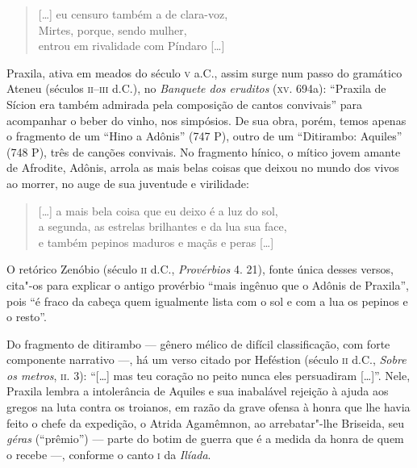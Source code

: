 \begin{quote}
\mbox[\ldots{}] eu censuro também a de clara-voz,\\
Mirtes, porque, sendo mulher,\\
entrou em rivalidade com Píndaro [\ldots{}]
\end{quote}

Praxila, ativa em meados do século \textsc{v} a.C., assim surge num passo do gramático
Ateneu (séculos \textsc{ii}--\textsc{iii} d.C.), no \textit{Banquete dos eruditos} (\textsc{xv}. 694a):
``Praxila de Sícion era também admirada pela composição de cantos
convivais” para acompanhar o beber do vinho, nos simpósios. De sua obra,
porém, temos apenas o fragmento de um “Hino a Adônis” (747 P), outro
de um “Ditirambo: Aquiles” (748 P), três de canções convivais. No fragmento
hínico, o mítico jovem amante de Afrodite, Adônis, arrola as mais belas coisas
que deixou no mundo dos vivos ao morrer, no auge de sua juventude e virilidade:

\begin{quote}
\mbox[\ldots{}] a mais bela coisa que eu deixo é a luz do sol,\\
a segunda, as estrelas brilhantes e da lua sua face,\\
e também pepinos maduros e maçãs e peras [\ldots{}]
\end{quote}

O retórico Zenóbio (século \textsc{ii} d.C., \textit{Provérbios} 4. 21), fonte única
desses versos, cita"-os para explicar o antigo provérbio ``mais ingênuo
que o Adônis de Praxila”, pois “é fraco da cabeça quem igualmente
lista com o sol e com a lua os pepinos e o resto”.

Do fragmento de ditirambo --- gênero mélico de difícil classificação, com forte
componente narrativo ---, há um verso citado por Heféstion (século \textsc{ii} d.C.,
\textit{Sobre os metros}, \textsc{ii}. 3): ``[\ldots{}] mas teu coração no peito nunca
eles persuadiram [\ldots{}]”. Nele, Praxila lembra a intolerância de Aquiles e sua
inabalável rejeição à ajuda aos gregos na luta contra os troianos, em razão da
grave ofensa à honra que lhe havia feito o chefe da expedição, o Atrida
Agamêmnon, ao arrebatar"-lhe Briseida, seu \textit{géras} (“prêmio”) --- parte do
botim de guerra que é a medida da honra de quem o recebe ---, conforme o canto \textsc{i}
da \textit{Ilíada}.

